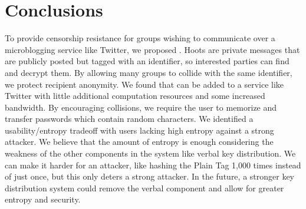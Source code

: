\section{Conclusions}

To provide censorship resistance for groups wishing to communicate over a microblogging service like Twitter, we proposed \hoot. Hoots are private messages that are publicly posted but tagged with an identifier, so interested parties can find and decrypt them. By allowing many groups to collide with the same identifier, we protect recipient anonymity. We found that \hoot can be added to a service like Twitter with little additional computation resources and some increased bandwidth. By encouraging collisions, we require the user to memorize and transfer passwords which contain random characters. We identified a usability/entropy tradeoff with users lacking high entropy against a strong attacker. We believe that the amount of entropy is enough considering the weakness of the other components in the system like verbal key distribution. We can make it harder for an attacker, like hashing the Plain Tag 1,000 times instead of just once, but this only deters a strong attacker. In the future, a stronger key distribution system could remove the verbal component and allow for greater entropy and security.